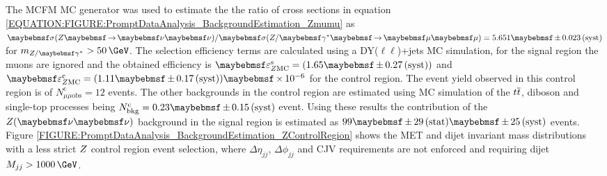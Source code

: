 The \textsc{MCFM} \gls{MC} generator \cite{ARTICLE:MCFMGenerator} was used to estimate the the ratio of cross sections in equation \ref{EQUATION:FIGURE:PromptDataAnalysis_BackgroundEstimation_Zmumu} as $\sigma(\Z \to \nu \nu) / \sigma(\Z/\gamma^{*} \to \mu \mu) = 5.651 \pm 0.023\syst$ for $m_{\Z/\gamma^{*}} > 50\,\GeV$. The selection efficiency terms are calculated using a DY($\ell\ell$)+jets \gls{MC} simulation, for the signal region the muons are ignored and the obtained efficiency is $\varepsilon^\mathrm{s}_{\Z \mathrm{MC}} = (1.65 \pm 0.27\syst)$ and $\varepsilon^\mathrm{c}_{\Z \mathrm{MC}}=(1.11 \pm 0.17\syst) \times 10^{-6}$ for the control region. The event yield observed in this control region is of $N^\mathrm{c}_{\mu\mu\text{obs}} = 12$ events. The other backgrounds in the control region are estimated using \gls{MC} simulation of the $t\overline{t}$, diboson and single-top processes being $N^\mathrm{c}_\text{bkg}=0.23 \pm 0.15\syst$ event. Using  these results the contribution of the  $\Z (\nu \nu)$ background in the signal region is estimated as $99 \pm 29\stat \pm 25\syst$ events. Figure \ref{FIGURE:PromptDataAnalysis_BackgroundEstimation_ZControlRegion} shows the \gls{MET} and dijet invariant mass distributions with a less strict $Z$ control region event selection, where $\Delta\eta_{jj}$, $\Delta\phi_{jj}$ and \gls{CJV} requirements are not enforced and requiring dijet $M_{jj}>1000\,\GeV$. 

